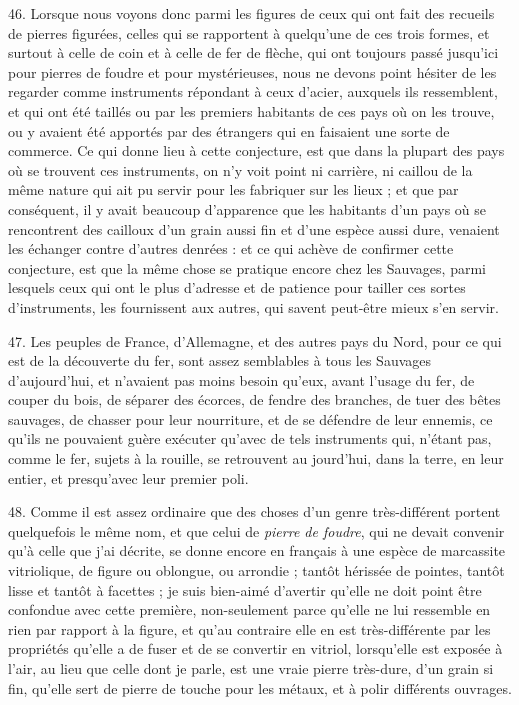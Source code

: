 \documentclass[a4paper, 11pt, oneside, polutonikogreek, french]{article}
\begin{document}
46. Lorsque nous voyons donc parmi les figures de ceux qui ont fait des recueils de pierres figurées, celles qui se rapportent à quelqu'une de ces trois formes, et surtout à celle de coin et à celle de fer de flèche, qui ont toujours passé jusqu'ici pour pierres de foudre et pour mystérieuses, nous ne devons point hésiter de les regarder comme instruments répondant à ceux d'acier, auxquels ils ressemblent, et qui ont été taillés ou par les premiers habitants de ces pays où on les trouve, ou y avaient été apportés par des étrangers qui en faisaient une sorte de commerce. Ce qui donne lieu à cette conjecture, est que dans la plupart des pays où se trouvent ces instruments, on n'y voit point ni carrière, ni caillou de la même nature qui ait pu servir pour les fabriquer sur les lieux ; et que par conséquent, il y avait beaucoup d'apparence que les habitants d'un pays où se rencontrent des cailloux d'un grain aussi fin et d'une espèce aussi dure, venaient les échanger contre d'autres denrées : et ce qui achève de confirmer cette conjecture, est que la même chose se pratique encore chez les Sauvages, parmi lesquels ceux qui ont le plus d'adresse et de patience pour tailler ces sortes d'instruments, les fournissent aux autres, qui savent peut-être mieux s'en servir.

47. Les peuples de France, d'Allemagne, et des autres pays du Nord, pour ce qui est de la découverte du fer, sont assez semblables à tous les Sauvages d'aujourd'hui, et n'avaient pas moins besoin qu'eux, avant l'usage du fer, de couper du bois, de séparer des écorces, de fendre des branches, de tuer des bêtes sauvages, de chasser pour leur nourriture, et de se défendre de leur ennemis, ce qu'ils ne pouvaient guère exécuter qu'avec de tels instruments qui, n'étant pas, comme le fer, sujets à la rouille, se retrouvent au jourd'hui, dans la terre, en leur entier, et presqu'avec leur premier poli.

48. Comme il est assez ordinaire que des choses d'un genre très-différent portent quelquefois le même nom, et que celui de \emph{pierre de foudre}, qui ne devait convenir qu'à celle que j'ai décrite, se donne encore en français à une espèce de marcassite vitriolique, de figure ou oblongue, ou arrondie ; tantôt hérissée de pointes, tantôt lisse et tantôt à facettes ; je suis bien-aimé d'avertir qu'elle ne doit point être confondue avec cette première, non-seulement parce qu'elle ne lui ressemble en rien par rapport à la figure, et qu'au contraire elle en est très-différente par les propriétés qu'elle a de fuser et de se convertir en vitriol, lorsqu'elle est exposée à l'air, au lieu que celle dont je parle, est une vraie pierre très-dure, d'un grain si fin, qu'elle sert de pierre de touche pour les métaux, et à polir différents ouvrages.
\end{document}
